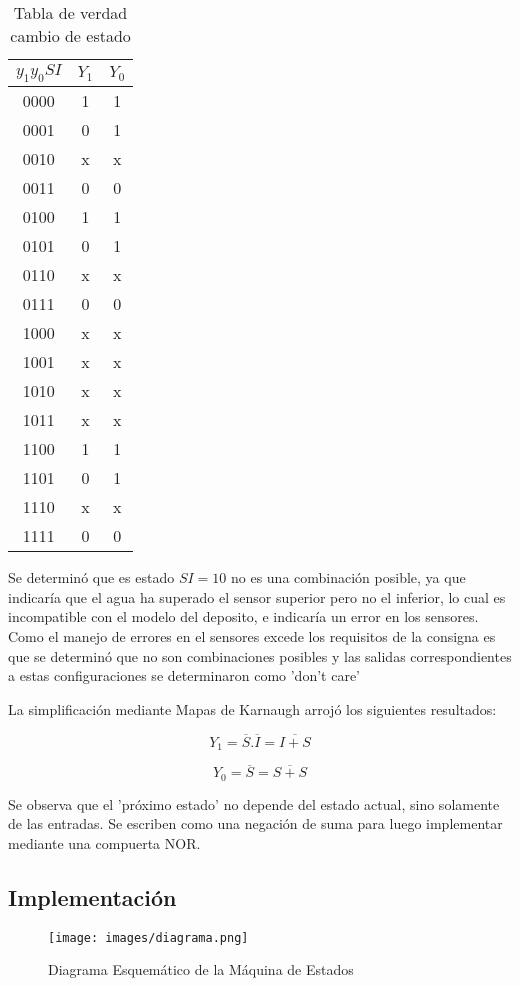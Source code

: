 \documentclass[10pt,a4paper]{article}
\begin{document}
\begin{table}[H]
	\centering
	\begin{tabular}{c|c|c}
	$y_1y_0SI$ & $Y_1$ & $Y_0$  \\ 
	\hline 
	0000 & 1 & 1  \\ 
	\hline 
	0001 & 0 & 1  \\ 
	\hline 
	0010 & x & x  \\ 
	\hline 
	0011 & 0 & 0  \\ 
	\hline 
	0100 & 1 & 1  \\ 
	\hline 
	0101 & 0 & 1  \\ 
	\hline 
	0110 & x & x  \\ 
	\hline 
	0111 & 0 & 0  \\ 
	\hline 
	1000 & x & x  \\ 
	\hline 
	1001 & x & x  \\ 
	\hline 
	1010 & x & x  \\ 
	\hline 
	1011 & x & x  \\ 
	\hline 
	1100 & 1 & 1  \\ 
	\hline 
	1101 & 0 & 1  \\ 
	\hline 
	1110 & x & x  \\ 
	\hline 
	1111 & 0 & 0  \\ 
	\end{tabular} 
	\caption{Tabla de verdad cambio de estado}
	\label{1_t2}
\end{table}

Se determinó que es estado $SI=10$ no es una combinación posible, ya que indicaría que el agua ha superado el sensor superior pero no el inferior, lo cual es incompatible con el modelo del deposito, e indicaría un error en los sensores. Como el manejo de errores en el sensores excede los requisitos de la consigna es que se determinó que no son combinaciones posibles y las salidas correspondientes a estas configuraciones se determinaron como 'don't care'

La simplificación mediante Mapas de Karnaugh arrojó los siguientes resultados:

\[
Y_1 = \overline{S}.\overline{I} = \overline{I+S}
\]

\[
Y_0 = \overline{S} = \overline{S + S}
\]

Se observa que el 'próximo estado' no depende del estado actual, sino solamente de las entradas. Se escriben como una negación de suma para luego implementar mediante una compuerta NOR.

\subsection*{Implementación}
\begin{figure}[H]
\centering
\texttt{[image: images/diagrama.png]}
\caption{Diagrama Esquemático de la Máquina de Estados}
\label{1_fig2}
\end{figure}
\end{document}
